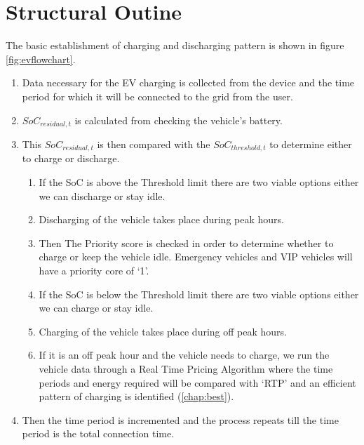 	
	\section{Structural Outine}
	 The basic establishment of charging and discharging pattern is shown in figure \ref{fig:evflowchart}.
	\begin{enumerate}
		
		\item Data necessary for the EV charging is collected from the device and the time period for which it will be connected to the grid from the user.
		
		\item $SoC_{residual,t}$ is calculated from checking the vehicle's battery.
		
		\item This $SoC_{residual,t}$ is then compared with the $SoC_{threshold,t}$ to determine either to charge or discharge.
		
	
		\begin{enumerate}

			 \item If the SoC is above the Threshold limit there are two viable options either we can discharge or stay idle.
			 

	 	
				 	\item Discharging of the vehicle takes place during peak hours.
					\item Then The Priority score is checked in order to determine whether to charge or keep the vehicle idle. Emergency vehicles and VIP vehicles will have a priority core of `1'.

				
			 \item If the SoC is below the Threshold limit there are two viable options either we can charge or stay idle.
			 
	
			 		\item Charging of the vehicle takes place during off peak hours.
			 		\item If it is an off peak hour and the vehicle needs to charge, we run the vehicle data through a Real Time Pricing Algorithm where the time periods and energy required will be compared with `RTP' and an efficient pattern of charging is identified (\ref{chap:best}).
			 		

		\end{enumerate}
		
		\item Then the time period is incremented and the process repeats till the time period is the total connection time.
	\end{enumerate}
	

